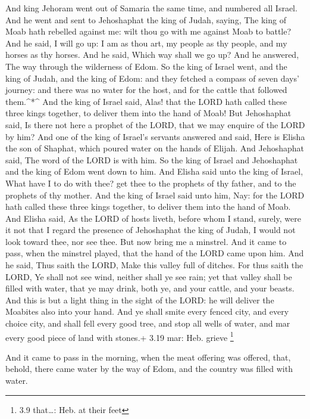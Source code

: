  And king Jehoram went out of Samaria the same time, and
numbered all Israel.  And he went and sent to Jehoshaphat
the king of Judah, saying, The king of Moab hath rebelled against me:
wilt thou go with me against Moab to battle? And he said, I will go up:
I am as thou art, my people as thy people, and my horses as thy horses.
 And he said, Which way shall we go up? And he answered, The
way through the wilderness of Edom.  So the king of Israel
went, and the king of Judah, and the king of Edom: and they fetched a
compass of seven days' journey: and there was no water for the host, and
for the cattle that followed them.\^{}*\^{}  And the king
of Israel said, Alas! that the LORD hath called these three kings
together, to deliver them into the hand of Moab!  But
Jehoshaphat said, Is there not here a prophet of the LORD, that we may
enquire of the LORD by him? And one of the king of Israel's servants
answered and said, Here is Elisha the son of Shaphat, which poured water
on the hands of Elijah.  And Jehoshaphat said, The word of
the LORD is with him. So the king of Israel and Jehoshaphat and the king
of Edom went down to him.  And Elisha said unto the king of
Israel, What have I to do with thee? get thee to the prophets of thy
father, and to the prophets of thy mother. And the king of Israel said
unto him, Nay: for the LORD hath called these three kings together, to
deliver them into the hand of Moab.  And Elisha said, As
the LORD of hosts liveth, before whom I stand, surely, were it not that
I regard the presence of Jehoshaphat the king of Judah, I would not look
toward thee, nor see thee.  But now bring me a minstrel.
And it came to pass, when the minstrel played, that the hand of the LORD
came upon him.  And he said, Thus saith the LORD, Make this
valley full of ditches.  For thus saith the LORD, Ye shall
not see wind, neither shall ye see rain; yet that valley shall be filled
with water, that ye may drink, both ye, and your cattle, and your
beasts.  And this is but a light thing in the sight of the
LORD: he will deliver the Moabites also into your hand. 
And ye shall smite every fenced city, and every choice city, and shall
fell every good tree, and stop all wells of water, and mar every good
piece of land with stones.+ 3.19 mar: Heb. grieve \footnote{3.9
  that\ldots: Heb. at their feet}

 And it came to pass in the morning, when the meat offering
was offered, that, behold, there came water by the way of Edom, and the
country was filled with water.

